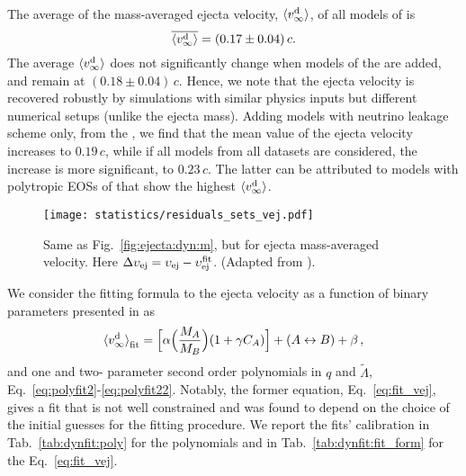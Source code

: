 The average of the mass-averaged ejecta velocity, $\langle v^{\text{d}}_\infty\rangle$, 
of all models of \DSrefset{} is 
%
\begin{equation}
\label{eq:ejecta:dyn:avg:v}
\overline{\langle v^{\text{d}}_\infty\rangle} = (0.17\pm0.04)\,c . 
\end{equation}
%
The average $\langle v^{\text{d}}_\infty\rangle$ does not significantly change when models of the \DSheatcool{} 
are added, and remain at $(0.18 \pm 0.04) \, c$.
Hence, we note that the ejecta velocity is recovered robustly by simulations with 
similar physics inputs but different numerical setups  
(unlike the ejecta mass). 
%
Adding models with neutrino leakage scheme only, from the \DScool{}, 
we find that the mean value of the ejecta 
velocity increases to $0.19\, c$, while if all models from all datasets are considered, 
the increase is more significant, to $0.23\, c$. 
The latter can be attributed to models 
with polytropic \acp{EOS} of \citet{Bauswein:2013yna} 
that show the highest $\langle v^{\text{d}}_\infty\rangle$. 

\begin{figure}[t!]
    \centering 
    \texttt{[image: statistics/residuals\_sets\_vej.pdf]}
    \caption{
        Same as Fig.~\ref{fig:ejecta:dyn:m}, but for ejecta mass-averaged 
        velocity. 
        Here 
        $\Delta \upsilon_{\rm ej} = \upsilon_{\rm ej} - \upsilon^{\rm fit}_{\rm ej}$.
        (Adapted from \citet{Nedora:2020qtd}).
    }
    \label{fig:ejecta:dyn:v}
\end{figure}


We consider the fitting formula to the ejecta velocity as a function of binary parameters 
presented in \citet{Dietrich:2016hky,Radice:2018pdn} as
%
\begin{equation}
{\langle v^{\text{d}}_\infty\rangle}_{\rm fit} = \Big[\alpha\Big(\frac{M_A}{M_B}\Big)(1+\gamma C_A)\Big] + (A\leftrightarrow B) + \beta
\label{eq:fit_vej} \, ,
\end{equation}
%
and one and two- parameter second order polynomials in $q$ and $\tilde{\Lambda}$, 
Eq.~\eqref{eq:polyfit2}-\eqref{eq:polyfit22}. Notably, the former equation, 
Eq.~\eqref{eq:fit_vej}, gives a fit that is not well constrained and was found to 
depend on the choice of the initial guesses for the fitting procedure.
%
We report the fits' calibration in Tab.~\ref{tab:dynfit:poly} for the polynomials and 
in Tab.~\ref{tab:dynfit:fit_form} for the Eq.~\eqref{eq:fit_vej}.

